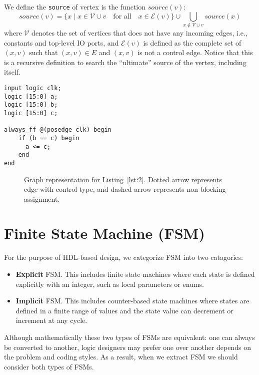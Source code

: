 \documentclass{article}
\begin{document}
We define the \texttt{source} of vertex is the function $source(v)$:
\[
    source(v) = \{x \mid x \in \mathcal{V} \cup {v}\quad\text{for all}\quad x \in \mathcal{E}(v) \} \cup \bigcup_{x \not \in \mathcal{V} \cup {v}}
                source(x)
\]
where $\mathcal{V}$ denotes the set of vertices that does not have any incoming edges,
i.e., constants and top-level IO ports, and $\mathcal{E}(v)$ is defined as the complete
set of $(x, v)$ such that $(x, v) \in E$ and $(x, v)$ is not a control edge.
Notice that this is a recursive definition to search the ``ultimate'' source of the
vertex, including itself.

\begin{lstlisting}[style={verilog-style}, caption={Control vertex and non-blocking
    assignment Verilog code},
    label={lst:2}]
input logic clk;
logic [15:0] a;
logic [15:0] b;
logic [15:0] c;

always_ff @(posedge clk) begin
    if (b == c) begin
      a <= c;
    end
end
\end{lstlisting}

\begin{figure}
    \centering
    \begin{tikzpicture}
    
    \end{tikzpicture}
    \caption{Graph representation for Listing~\ref{lst:2}. Dotted arrow represents edge with control
    type, and dashed arrow represents non-blocking assignment.}
    \label{fig:2}
\end{figure}

\section{Finite State Machine (FSM)}\label{sec:fsm}
For the purpose of HDL-based design, we categorize FSM into two catagories:
\begin{itemize}
    \item \textbf{Explicit} FSM. This includes finite state machines where each state
    is defined explicitly with an integer, such as local parameters or enums.
    \item \textbf{Implicit} FSM. This includes counter-based state machines where
    states are defined in a finite range of values and the state value can decrement
    or increment at any cycle.
\end{itemize}
Although mathematically these two types of FSMs are equivalent: one can always be
converted to another, logic designers may prefer one over another depends on the
problem and coding styles. As a result, when we extract FSM we should consider both
types of FSMs.
\end{document}
